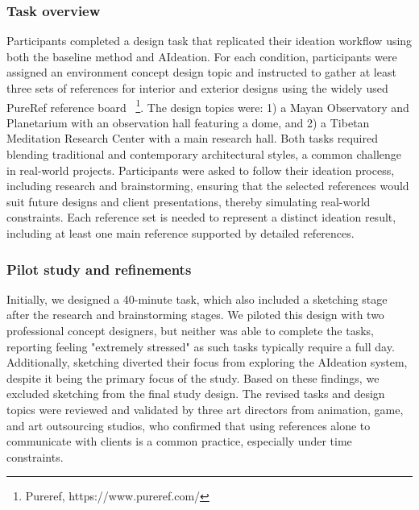 \subsubsection{Task overview}
Participants completed a design task that replicated their ideation workflow using both the baseline method and AIdeation. For each condition, participants were assigned an environment concept design topic and instructed to gather at least three sets of references for interior and exterior designs using the widely used PureRef reference board ~\footnote{Pureref, https://www.pureref.com/}. The design topics were: 1) a Mayan Observatory and Planetarium with an observation hall featuring a dome, and 2) a Tibetan Meditation Research Center with a main research hall. Both tasks required blending traditional and contemporary architectural styles, a common challenge in real-world projects. Participants were asked to follow their ideation process, including research and brainstorming, ensuring that the selected references would suit future designs and client presentations, thereby simulating real-world constraints. Each reference set is needed to represent a distinct ideation result, including at least one main reference supported by detailed references.

\subsubsection{Pilot study and refinements}
Initially, we designed a 40-minute task, which also included a sketching stage after the research and brainstorming stages. We piloted this design with two professional concept designers, but neither was able to complete the tasks, reporting feeling "extremely stressed" as such tasks typically require a full day. Additionally, sketching diverted their focus from exploring the AIdeation system, despite it being the primary focus of the study. Based on these findings, we excluded sketching from the final study design. The revised tasks and design topics were reviewed and validated by three art directors from animation, game, and art outsourcing studios, who confirmed that using references alone to communicate with clients is a common practice, especially under time constraints.



